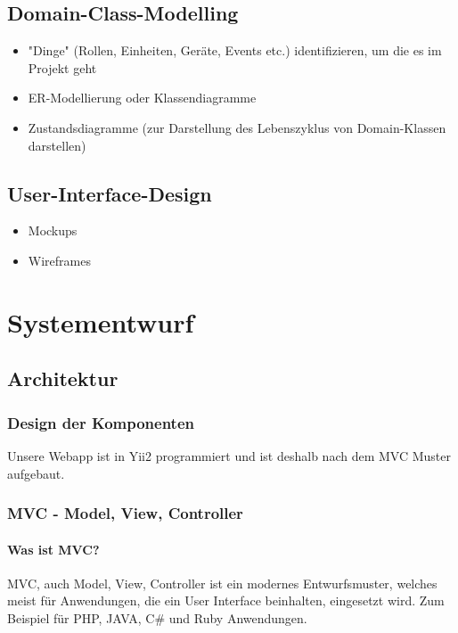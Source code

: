 \section{Domain-Class-Modelling}
\begin{itemize}
	\item "Dinge" (Rollen, Einheiten, Geräte, Events etc.) identifizieren, um die es im Projekt geht
	\item ER-Modellierung oder Klassendiagramme
	\item Zustandsdiagramme (zur Darstellung des Lebenszyklus von Domain-Klassen darstellen)
\end{itemize}

\section{User-Interface-Design}
\begin{itemize}
	\item Mockups
	\item Wireframes
\end{itemize}


\chapter{Systementwurf}

\section{Architektur}
\def \currentAuthor{Florian Tipotsch}
\subsection{Design der Komponenten}

Unsere Webapp ist in Yii2 programmiert und ist deshalb nach dem MVC Muster aufgebaut.
\subsection{MVC - Model, View, Controller}\label{sec:MVC}

\subsubsection{Was ist MVC?} 
MVC, auch Model, View, Controller ist ein modernes Entwurfsmuster, welches meist für Anwendungen, die ein User Interface beinhalten, eingesetzt wird. Zum Beispiel für PHP, JAVA, C\# und Ruby Anwendungen. \cite{MVC}

